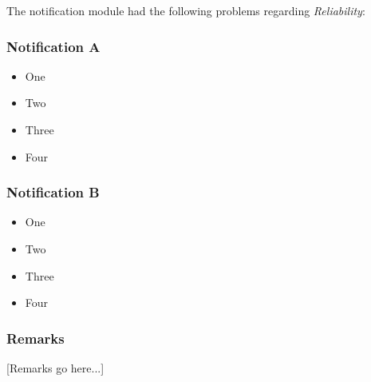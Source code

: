 
The notification module had the following problems regarding \emph{Reliability}:
\subsubsection*{Notification A}
\begin{itemize}
    \item One 
    \item Two 
    \item Three 
    \item Four 
\end{itemize}
\subsubsection*{Notification B}
\begin{itemize}
    \item One 
    \item Two 
    \item Three 
    \item Four 
\end{itemize}
\subsubsection*{Remarks}
[Remarks go here...]
